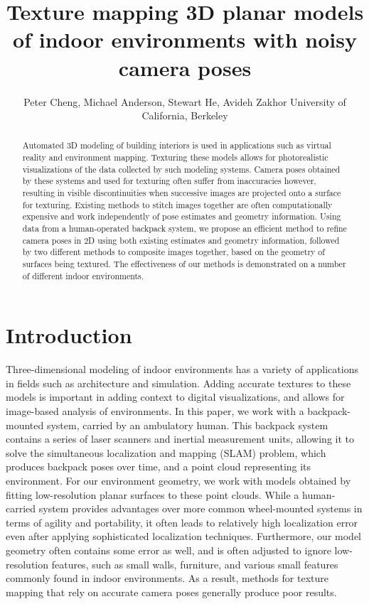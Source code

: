 \documentclass[]{spie}  %
\title{Texture mapping 3D planar models of indoor environments with noisy camera poses}
\author{Peter Cheng, Michael Anderson, Stewart He, Avideh Zakhor
\skiplinehalf
University of California, Berkeley\\
}
\begin{document}
\maketitle

\begin{abstract}
  Automated 3D modeling of building interiors is used in applications
  such as virtual reality and environment mapping. Texturing these
  models allows for photorealistic visualizations of the data
  collected by such modeling systems. Camera poses obtained by these
  systems and used for texturing often suffer from inaccuracies
  however, resulting in visible discontinuities when successive images
  are projected onto a surface for texturing. Existing methods to
  stitch images together are often computationally expensive and work
  independently of pose estimates and geometry information. Using data
  from a human-operated backpack system, we propose an efficient
  method to refine camera poses in 2D using both existing estimates
  and geometry information, followed by two different methods to
  composite images together, based on the geometry of surfaces being
  textured. The effectiveness of our methods is demonstrated on a
  number of different indoor environments.
\end{abstract}



\section{Introduction}
\label{sec:introduction}
Three-dimensional modeling of indoor environments has a variety of
applications in fields such as architecture and simulation. Adding
accurate textures to these models is important in adding context to
digital visualizations, and allows for image-based analysis of
environments.  In this paper, we work with a backpack-mounted system,
carried by an ambulatory human. This backpack system contains a series
of laser scanners and inertial measurement units, allowing it to solve
the simultaneous localization and mapping (SLAM) problem, which
produces backpack poses over time, and a point cloud representing its
environment. For our environment geometry, we work with models
obtained by fitting low-resolution planar surfaces to these point
clouds.  While a human-carried system provides advantages over more
common wheel-mounted systems in terms of agility and portability, it
often leads to relatively high localization error even after applying
sophisticated localization techniques. Furthermore, our model geometry
often contains some error as well, and is often adjusted to ignore
low-resolution features, such as small walls, furniture, and various
small features commonly found in indoor environments. As a result,
methods for texture mapping that rely on accurate camera poses
generally produce poor results.
\end{document}
